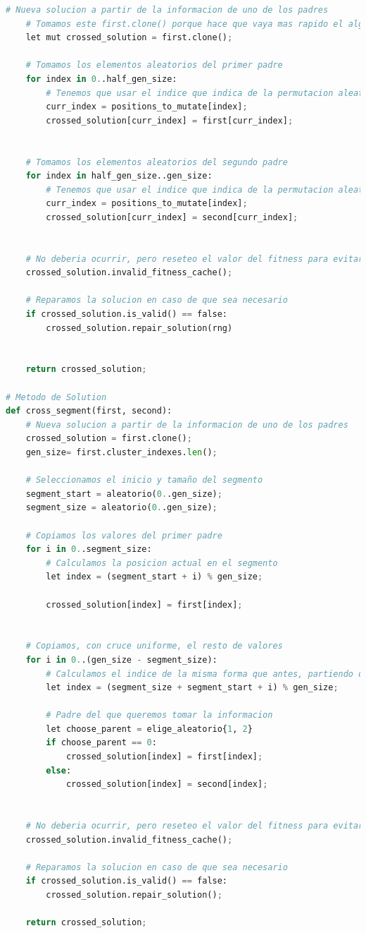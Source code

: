 \documentclass[11pt]{article}
\begin{document}
\begin{lstlisting}[language=Python, style=Boxed]
    # Nueva solucion a partir de la informacion de uno de los padres
    # Tomamos este first.clone() porque hace que vaya mas rapido el algoritmo
    let mut crossed_solution = first.clone();

    # Tomamos los elementos aleatorios del primer padre
    for index in 0..half_gen_size:
        # Tenemos que usar el indice que indica de la permutacion aleatoria
        curr_index = positions_to_mutate[index];
        crossed_solution[curr_index] = first[curr_index];


    # Tomamos los elementos aleatorios del segundo padre
    for index in half_gen_size..gen_size:
        # Tenemos que usar el indice que indica de la permutacion aleatoria
        curr_index = positions_to_mutate[index];
        crossed_solution[curr_index] = second[curr_index];


    # No deberia ocurrir, pero reseteo el valor del fitness para evitar problemas
    crossed_solution.invalid_fitness_cache();

    # Reparamos la solucion en caso de que sea necesario
    if crossed_solution.is_valid() == false:
        crossed_solution.repair_solution(rng)


    return crossed_solution;

# Metodo de Solution
def cross_segment(first, second):
    # Nueva solucion a partir de la informacion de uno de los padres
    crossed_solution = first.clone();
    gen_size= first.cluster_indexes.len();

    # Seleccionamos el inicio y tamaño del segmento
    segment_start = aleatorio(0..gen_size);
    segment_size = aleatorio(0..gen_size);

    # Copiamos los valores del primer padre
    for i in 0..segment_size:
        # Calculamos la posicion actual en el segmento
        let index = (segment_start + i) % gen_size;

        crossed_solution[index] = first[index];


    # Copiamos, con cruce uniforme, el resto de valores
    for i in 0..(gen_size - segment_size):
        # Calculamos el indice de la misma forma que antes, partiendo de donde nos quedamos
        let index = (segment_size + segment_start + i) % gen_size;

        # Padre del que queremos tomar la informacion
        let choose_parent = elige_aleatorio{1, 2}
        if choose_parent == 0:
            crossed_solution[index] = first[index];
        else:
            crossed_solution[index] = second[index];


    # No deberia ocurrir, pero reseteo el valor del fitness para evitar problemas
    crossed_solution.invalid_fitness_cache();

    # Reparamos la solucion en caso de que sea necesario
    if crossed_solution.is_valid() == false:
        crossed_solution.repair_solution();

    return crossed_solution;
\end{lstlisting}
\end{document}
